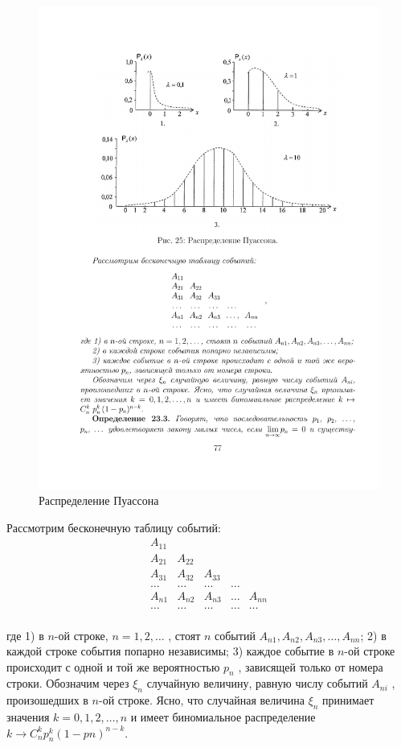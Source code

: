 \begin{figure}[H]
	\centering
	\includegraphics[]{pic/pic25}
	\caption{Распределение Пуассона}
	\label{fig25}
\end{figure} 
Рассмотрим бесконечную таблицу событий:
$$\begin{matrix} 
A_{11} &  &  &  &  \\
A_{21} & A_{22} &  &  &  \\
A_{31} & A_{32} & A_{33} &  &  \\
\ldots & \ldots & \ldots & \ldots &  \\
A_{n1} & A_{n2} & A_{n3} & \ldots & A_{nn}\\
\ldots & \ldots & \ldots & \ldots & \ldots\\   
\end{matrix}$$

где 1) в $n$-ой строке, $n = 1, 2, \ldots$ , стоят $n$ событий $A_{n1} , A_{n2} , A_{n3} , \ldots , A_{nn}$;
2) в каждой строке события попарно независимы;
3) каждое событие в $n$-ой строке происходит с одной и той же вероятностью $p_n$ , зависящей только от номера строки.
Обозначим через $\xi_n$ случайную величину, равную числу событий $A_{ni}$ , произошедших в $n$-ой строке. Ясно, что случайная величина $\xi_n$ принимает значения $k = 0, 1, 2, \ldots , n$ и имеет биномиальное распределение $k \to C_n^k p^k_n (1 − pn )^{n−k}.$

